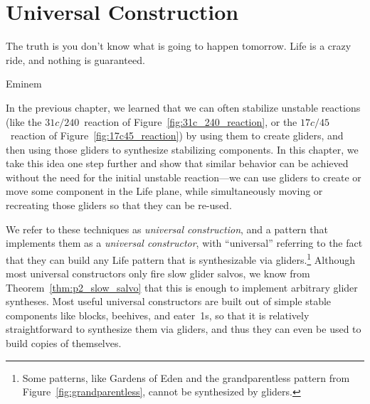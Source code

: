 
\renewcommand{\chapterfolder}{universal_construction/}
\chapter{Universal Construction}\label{chp:universal_construction}


\vspace*{-0.4in}
\epigraph{The truth is you don't know what is going to happen tomorrow. Life is a crazy ride, and nothing is guaranteed.}{Eminem}
\vspace*{0.4in}



\noindent In the previous chapter, we learned that we can often stabilize unstable reactions (like the $31c/240$~reaction of Figure~\ref{fig:31c_240_reaction}, or the $17c/45$~reaction of Figure~\ref{fig:17c45_reaction}) by using them to create gliders, and then using those gliders to synthesize stabilizing components. In this chapter, we take this idea one step further and show that similar behavior can be achieved without the need for the initial unstable reaction---we can use gliders to create or move some component in the Life plane, while simultaneously moving or recreating those gliders so that they can be re-used.

We refer to these techniques as \emph{universal construction}, and a pattern that implements them as a \emph{universal constructor}, with ``universal'' referring to the fact that they can build any Life pattern that is synthesizable via gliders.\footnote{Some patterns, like Gardens of Eden and the grandparentless pattern from Figure~\ref{fig:grandparentless}, cannot be synthesized by gliders.} Although most universal constructors only fire slow glider salvos, we know from Theorem~\ref{thm:p2_slow_salvo} that this is enough to implement arbitrary glider syntheses. Most useful universal constructors are built out of simple stable components like blocks, beehives, and eater~1s, so that it is relatively straightforward to synthesize them via gliders, and thus they can even be used to build copies of themselves.

